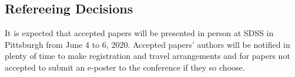 \documentclass[10pt]{article}
\begin{document}
\subsection{Refereeing Decisions}
It is expected that accepted papers will be presented in person at SDSS in Pittsburgh 
from June 4 to 6, 2020.
Accepted papers' authors will be notified in plenty of time to make registration and travel 
arrangements and for papers not accepted to submit an e-poster to the 
conference if they so choose.


\end{document}
